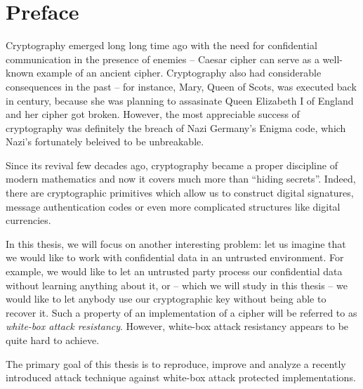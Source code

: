 \cleardoublepage{}

\chapter*{Preface}


Cryptography emerged long long time ago with the need for confidential communication in the presence of enemies -- Caesar cipher can serve as a well-known example of an ancient cipher. Cryptography also had considerable consequences in the past -- for instance, Mary, Queen of Scots, was executed back in  century, because she was planning to assasinate Queen Elizabeth I of England and her cipher got broken. However, the most appreciable success of cryptography was definitely the breach of Nazi Germany's Enigma code, which Nazi's fortunately beleived to be unbreakable.

Since its revival few decades ago, cryptography became a proper discipline of modern mathematics and now it covers much more than ``hiding secrets''. Indeed, there are cryptographic primitives which allow us to construct digital signatures, message authentication codes or even more complicated structures like digital currencies.

In this thesis, we will focus on another interesting problem: let us imagine that we would like to work with confidential data in an untrusted environment. For example, we would like to let an untrusted party process our confidential data without learning anything about it, or -- which we will study in this thesis -- we would like to let anybody use our cryptographic key without being able to recover it. Such a property of an implementation of a cipher will be referred to as {\em white-box attack resistancy}. However, white-box attack resistancy appears to be quite hard to achieve.

The primary goal of this thesis is to reproduce, improve and analyze a recently introduced attack technique against white-box attack protected implementations.



